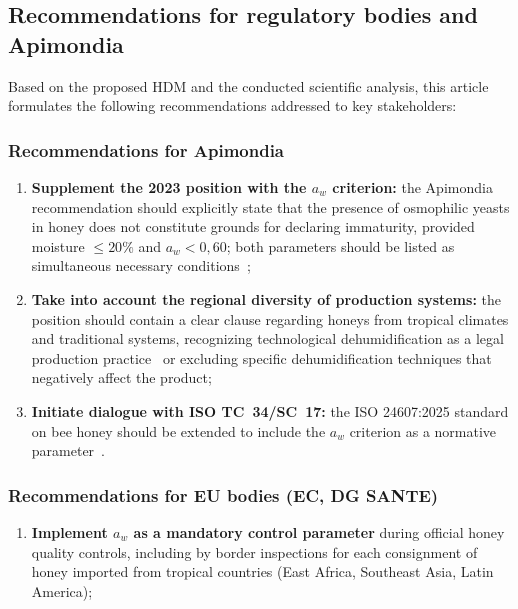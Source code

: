 \subsection{Recommendations for regulatory bodies and Apimondia}

Based on the proposed HDM and the conducted scientific analysis,
this article formulates the following recommendations addressed
to key stakeholders:

\subsubsection{Recommendations for Apimondia}

\begin{enumerate}
    \item \textbf{Supplement the 2023 position with the $a_w$
          criterion:} the Apimondia recommendation should
          explicitly state that the presence of osmophilic yeasts
          in honey does not constitute grounds for declaring
          immaturity, provided moisture $\leq 20\%$ and
          $a_w < 0{,}60$; both parameters should be listed as
          simultaneous necessary
          conditions~\cite{ruegg1981,waaw2006};
    \item \textbf{Take into account the regional diversity of
          production systems:} the position should contain a clear
          clause regarding honeys from tropical climates and
          traditional systems, recognizing technological
          dehumidification as a legal production practice~\cite{tadele2025}
          or excluding specific dehumidification techniques
          that negatively affect the product;
    \item \textbf{Initiate dialogue with ISO TC~34/SC~17:}
          the ISO 24607:2025 standard on bee honey should be
          extended to include the $a_w$ criterion as a normative
          parameter~\cite{codex_stan12}.
\end{enumerate}

\subsubsection{Recommendations for EU bodies (EC, DG SANTE)}

\begin{enumerate}
    \item \textbf{Implement $a_w$ as a mandatory control parameter}
          during official honey quality controls, including by
          border inspections for each consignment of honey
          imported from tropical countries (East Africa,
          Southeast Asia, Latin America);
\end{enumerate}

